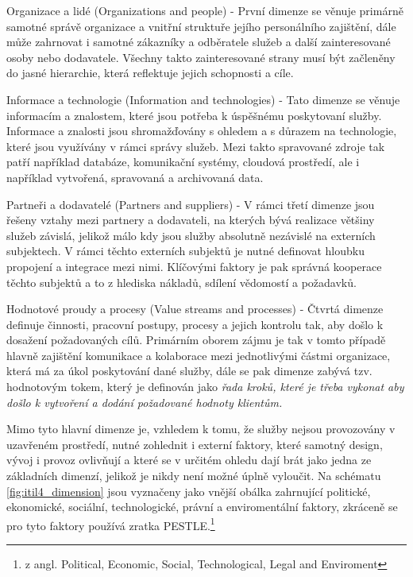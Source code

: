 \documentclass[
  digital,     %
  twoside,     %
  lof,         %
  lot,         %
]{fithesis4}
\begin{document}
\begin{compactitem}
    \item Organizace a lidé (Organizations and people) - První dimenze se věnuje primárně samotné správě organizace a vnitřní struktuře jejího personálního zajištění, dále může zahrnovat i samotné zákazníky a odběratele služeb a další zainteresované osoby nebo dodavatele. Všechny takto zainteresované strany musí být začleněny do jasné hierarchie, která reflektuje jejich schopnosti a cíle. 
    \item Informace a technologie (Information and technologies) - Tato dimenze se věnuje informacím a znalostem, které jsou potřeba k úspěšnému poskytovaní služby. Informace a znalosti jsou shromažďovány s ohledem a s důrazem na technologie, které jsou využívány v rámci správy služeb. Mezi takto spravované zdroje tak patří například databáze, komunikační systémy, cloudová prostředí, ale i například vytvořená, spravovaná a archivovaná data.
    \item Partneři a dodavatelé (Partners and suppliers) - V rámci třetí dimenze jsou řešeny vztahy mezi partnery a dodavateli, na kterých bývá realizace většiny služeb závislá, jelikož málo kdy jsou služby absolutně nezávislé na externích subjektech. V rámci těchto externích subjektů je nutné definovat hloubku propojení a integrace mezi nimi. Klíčovými faktory je pak správná kooperace těchto subjektů a to z hlediska nákladů, sdílení vědomostí a požadavků.
    
    \item Hodnotové proudy a procesy (Value streams and processes) - Čtvrtá dimenze definuje činnosti, pracovní postupy, procesy a jejich kontrolu tak, aby došlo k dosažení požadovaných cílů. Primárním oborem zájmu je tak v tomto případě hlavně zajištění komunikace a kolaborace mezi jednotlivými částmi organizace, která má za úkol poskytování dané služby, dále se pak dimenze zabývá tzv. hodnotovým tokem, který je definován jako \emph{řada kroků, které je třeba vykonat aby došlo k vytvoření a dodání požadované hodnoty klientům.}
\end{compactitem}

Mimo tyto hlavní dimenze je, vzhledem k tomu, že služby nejsou provozovány v uzavřeném prostředí, nutné zohlednit i externí faktory, které samotný design, vývoj i provoz ovlivňují a které se v určitém ohledu dají brát jako jedna ze základních dimenzí, jelikož je nikdy není možné úplně vyloučit. Na schématu \ref{fig:itil4_dimension} jsou vyznačeny jako vnější obálka zahrnující politické, ekonomické, sociální, technologické, právní a enviromentální faktory, zkráceně se pro tyto faktory používá zratka PESTLE.\footnote{z angl. Political, Economic, Social, Technological, Legal and Enviroment}
\end{document}
